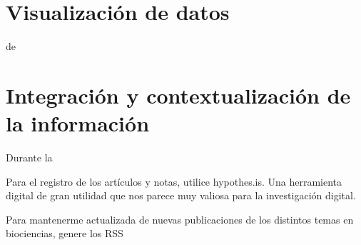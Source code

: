 \documentclass[../Main.tex]{subfiles}
\begin{document}
\section{Visualización de datos}
\noindent
de
\section{Integración y contextualización de la información}
\noindent
Durante la

\smallskip
Para el registro de los artículos y notas, utilice hypothes.is. Una herramienta digital de gran utilidad que nos parece muy valiosa para la investigación digital.

\smallskip
Para mantenerme actualizada de nuevas publicaciones de los distintos temas en biociencias, genere los RSS
\end{document}
